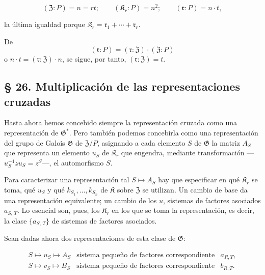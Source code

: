 \[
(\mathfrak Z:P)=n=rt;\qquad (\mathfrak K_r:P)=n^2;\qquad (\mathfrak r:P)=n\cdot t,
\]

la última igualdad porque \(\mathfrak K_r = \mathfrak r_1 + \cdots + \mathfrak r_r\).

De
\[(\mathfrak r:P) = (\mathfrak r:\mathfrak Z) \cdot (\mathfrak Z:P)\]
o \(n \cdot t = (\mathfrak r:\mathfrak Z) \cdot n\), se sigue, por tanto, \((\mathfrak r:\mathfrak Z) = t\).

\subsection*{§ 26. Multiplicación de las representaciones cruzadas}\label{multiplikation-der-verschraenkten-darstellungen}

Hasta ahora hemos concebido siempre la representación cruzada como una representación de \(\mathfrak G^*\). Pero también podemos concebirla como una representación del grupo de Galois \(\mathfrak G\) de \(\mathfrak Z/P\), asignando a cada elemento \(S\) de \(\mathfrak G\) la matriz \(A_S\) que representa un elemento \(u_S\) de \(\mathfrak K_r\) que engendra, mediante transformación ---\(u_S^{-1}zu_S=z^S\)---, el automorfismo \(S\).

Para caracterizar una representación tal \(S\mapsto A_S\) hay que especificar en qué \(\mathfrak K_r\) se toma, qué \(u_S\) y qué \(k_{S_1},\ldots,k_{S_n}\) de \(\mathfrak K\) sobre \(\mathfrak Z\) se utilizan. Un cambio de base da una representación equivalente; un cambio de los \(u\), sistemas de factores asociados \(a_{S,\,T}\). Lo esencial son, pues, los \(\mathfrak K_r\) en los que se toma la representación, es decir, la clase \(\{a_{S,\,T}\}\) de sistemas de factores asociados.

Sean dadas ahora dos representaciones de esta clase de \(\mathfrak G\):

\[
\begin{array}{lll}
S\mapsto u_S\mapsto A_S & \text{sistema pequeño de factores correspondiente} & a_{R,T},\\
S\mapsto v_S\mapsto B_S & \text{sistema pequeño de factores correspondiente} & b_{R,T}.
\end{array}
\]

